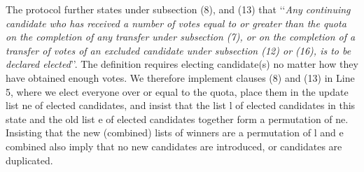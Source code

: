 \documentclass{llncs}
\begin{document}
The protocol further states under subsection (8), and (13) that \lq\lq \emph{Any continuing candidate who has received a number of votes equal to
or greater than the quota on the completion of any transfer under subsection (7), or on the completion of a transfer of votes of an
excluded candidate under subsection (12) or (16), is to be declared elected}\rq\rq. 
The definition requires electing candidate(s) no matter how they
have obtained enough votes. We therefore implement clauses (8) and
(13) in Line 5, where we elect everyone over or equal to the quota,
place them in the update list {\selectfont ne} of
elected candidates, 
and insist that the list {\selectfont l}  of elected
candidates in this state and 
the old list {\selectfont e} of elected candidates together form a
permutation of {\selectfont ne}. Insisting that the
new (combined) lists of winners are a permutation of
{\selectfont l} and {\selectfont e}
combined also imply that no new candidates are introduced, or
candidates are duplicated. 
\end{document}
